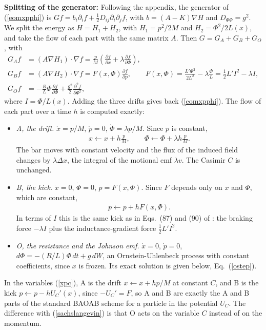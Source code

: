 \documentclass[11pt]{article}
\begin{document}
{\bf Splitting of the generator:} Following the appendix, the generator of (\ref{eomxpphi}) is $Gf=b_i\partial_if+\frac{1}{2}D_{ij}\partial_i\partial_jf$, with $b=(A-K)\nabla H$ and $D_{\Phi\Phi}=g^2$. We split the energy as $H=H_1+H_2$, with $H_1=p^2/2M$ and $H_2=\Phi^2/2L(x)$, and take the flow of each part with the same matrix $A$. Then $G=G_A+G_B+G_O$, with
\begin{align}
  G_Af&=(A\nabla H_1)\cdot\nabla f=\frac{p}{M}\left(\frac{\partial f}{\partial x}+\lambda\frac{\partial f}{\partial\Phi}\right),\nonumber\\
  G_Bf&=(A\nabla H_2)\cdot\nabla f=F(x,\Phi)\frac{\partial f}{\partial p},\qquad F(x,\Phi)=\frac{L'\Phi^2}{2L^2}-\lambda\frac{\Phi}{L}=\frac{1}{2}L'I^2-\lambda I,\nonumber\\
  G_Of&=-\frac{R}{L}\Phi\frac{\partial f}{\partial\Phi}+\frac{g^2}{2}\frac{\partial^2f}{\partial\Phi^2},
  \label{splitops}
\end{align}
where $I=\Phi/L(x)$. Adding the three drifts gives back (\ref{eomxpphi}). The flow of each part over a time $h$ is computed exactly:
\begin{itemize}
\item {\it A, the drift.} $\dot{x}=p/M$, $\dot{p}=0$, $\dot{\Phi}=\lambda p/M$. Since $p$ is constant,
  \begin{align}
    x\leftarrow x+h\frac{p}{M},\qquad\Phi\leftarrow\Phi+\lambda h\frac{p}{M}.
    \label{flowA}
  \end{align}
  The bar moves with constant velocity and the flux of the induced field changes by $\lambda\Delta x$, the integral of the motional emf $\lambda v$. The Casimir $C$ is unchanged.
\item {\it B, the kick.} $\dot{x}=0$, $\dot{\Phi}=0$, $\dot{p}=F(x,\Phi)$. Since $F$ depends only on $x$ and $\Phi$, which are constant,
  \begin{align}
    p\leftarrow p+hF(x,\Phi).
    \label{flowB}
  \end{align}
  In terms of $I$ this is the same kick as in Eqs.~(87) and (90) of \cite{alvarez}: the braking force $-\lambda I$ plus the inductance-gradient force $\frac{1}{2}L'I^2$.
\item {\it O, the resistance and the Johnson emf.} $\dot{x}=0$, $\dot{p}=0$, $d\Phi=-(R/L)\Phi\,dt+g\,dW$, an Ornstein-Uhlenbeck process with constant coefficients, since $x$ is frozen. Its exact solution is given below, Eq.~(\ref{ostep}).
\end{itemize}
In the variables (\ref{xpc}), A is the drift $x\leftarrow x+hp/M$ at constant $C$, and B is the kick $p\leftarrow p-hU_C'(x)$, since $-U_C'=F$, so A and B are exactly the A and B parts of the standard BAOAB scheme for a particle in the potential $U_C$. The difference with (\ref{sachslangevin}) is that O acts on the variable $C$ instead of on the momentum.
\end{document}
